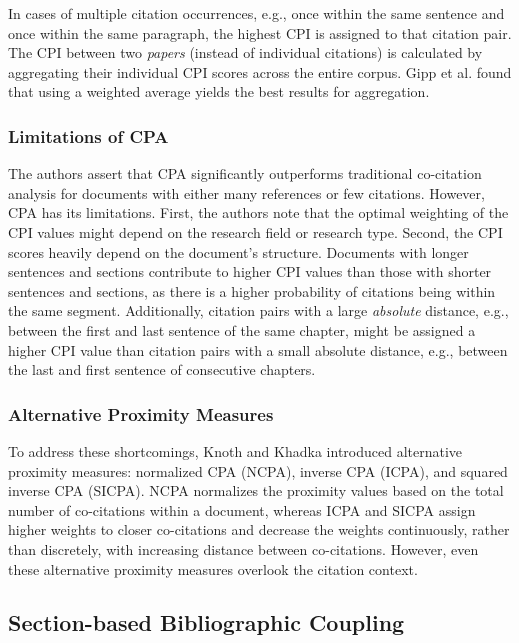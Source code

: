 In cases of multiple citation occurrences, e.g., once within the same sentence and once within the same paragraph, the highest \ac{CPI} is assigned to that citation pair. The \ac{CPI} between two \emph{papers} (instead of individual citations) is calculated by aggregating their individual \ac{CPI} scores across the entire corpus. Gipp et al. \cite{GippCitationProximity2009} found that using a weighted average yields the best results for aggregation.

\subsubsection*{Limitations of \acs{CPA}} \label{sec:limitations-of-cpa}

The authors assert that \ac{CPA} significantly outperforms traditional co-citation analysis for documents with either many references or few citations. However, \ac{CPA} has its limitations.
First, the authors note that the optimal weighting of the \ac{CPI} values might depend on the research field or research type.
Second, the \ac{CPI} scores heavily depend on the document's structure. Documents with longer sentences and sections contribute to higher \ac{CPI} values than those with shorter sentences and sections, as there is a higher probability of citations being within the same segment. Additionally, citation pairs with a large \emph{absolute} distance, e.g., between the first and last sentence of the same chapter, might be assigned a higher \ac{CPI} value than citation pairs with a small absolute distance, e.g., between the last and first sentence of consecutive chapters.

\subsubsection*{Alternative Proximity Measures} \label{sec:alternative-proximity-measures}

To address these shortcomings, Knoth and Khadka \cite{KnothCanWe2017} introduced alternative proximity measures: normalized \ac{CPA} (NCPA), inverse \ac{CPA} (ICPA), and squared inverse \ac{CPA} (SICPA). NCPA normalizes the proximity values based on the total number of co-citations within a document, whereas ICPA and SICPA assign higher weights to closer co-citations and decrease the weights continuously, rather than discretely, with increasing distance between co-citations. However, even these alternative proximity measures overlook the citation context.


\subsection{Section-based Bibliographic Coupling} \label{sec:section-based-bibliographic-coupling}

